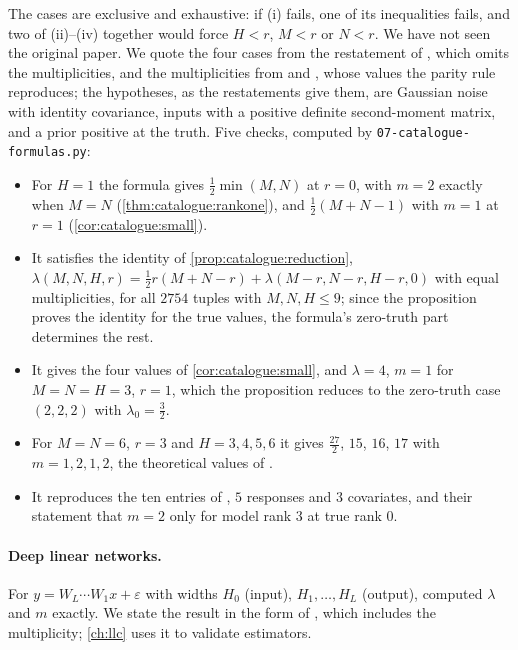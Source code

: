 \begin{refsection}
The cases are exclusive and exhaustive: if (i) fails, one of its inequalities fails, and two of (ii)--(iv) together would force $H<r$, $M<r$ or $N<r$. We have not seen the original paper. We quote the four cases from the restatement of \textcite[eq.~(6)]{HayashiWatanabe2017a}, which omits the multiplicities, and the multiplicities from \textcite[Table~3]{Watanabe2013} and \textcite[Example~2.2]{DrtonPlummer2017}, whose values the parity rule reproduces; the hypotheses, as the restatements give them, are Gaussian noise with identity covariance, inputs with a positive definite second-moment matrix, and a prior positive at the truth. Five checks, computed by \texttt{07-catalogue-formulas.py}:
\begin{itemize}
\item For $H=1$ the formula gives $\frac12\min(M,N)$ at $r=0$, with $m=2$ exactly when $M=N$ (\cref{thm:catalogue:rankone}), and $\frac12(M+N-1)$ with $m=1$ at $r=1$ (\cref{cor:catalogue:small}).
\item It satisfies the identity of \cref{prop:catalogue:reduction}, $\lambda(M,N,H,r)=\frac12r(M+N-r)+\lambda(M-r,N-r,H-r,0)$ with equal multiplicities, for all $2754$ tuples with $M,N,H\le9$; since the proposition proves the identity for the true values, the formula's zero-truth part determines the rest.
\item It gives the four values of \cref{cor:catalogue:small}, and $\lambda=4$, $m=1$ for $M=N=H=3$, $r=1$, which the proposition reduces to the zero-truth case $(2,2,2)$ with $\lambda_0=\frac32$.
\item For $M=N=6$, $r=3$ and $H=3,4,5,6$ it gives $\frac{27}2$, $15$, $16$, $17$ with $m=1,2,1,2$, the theoretical values of \textcite[Table~3]{Watanabe2013}.
\item It reproduces the ten entries of \textcite[Table~1]{DrtonPlummer2017}, $5$ responses and $3$ covariates, and their statement that $m=2$ only for model rank $3$ at true rank $0$.
\end{itemize}

\paragraph{Deep linear networks.} For $y=W_L\cdots W_1x+\varepsilon$ with widths $H_0$ (input), $H_1,\dots,H_L$ (output), \textcite{Aoyagi2024} computed $\lambda$ and $m$ exactly. We state the result in the form of \textcite[Definition~4 and Remark~1]{Aoyagi2025}, which includes the multiplicity; \cref{ch:llc} uses it to validate estimators.


\end{refsection}
